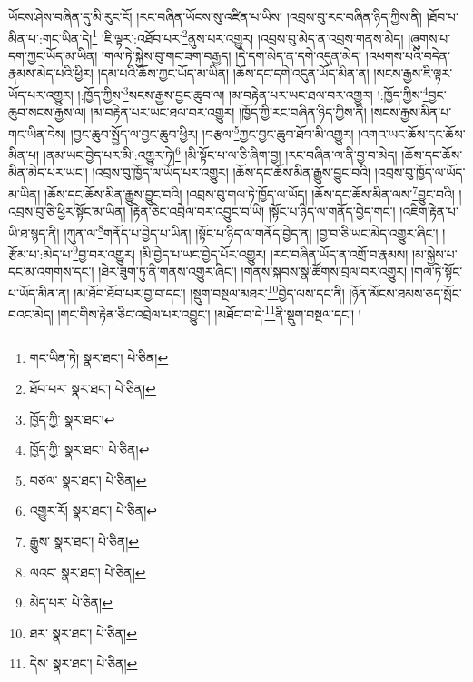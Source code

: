 ཡོངས་ཤེས་བཞིན་དུ་མི་རུང་ངོ། །རང་བཞིན་ཡོངས་སུ་འཛིན་པ་ཡིས། །འབྲས་བུ་རང་བཞིན་ཉིད་ཀྱིས་ནི། །ཐོབ་པ་མིན་པ་:གང་ཡིན་དེ།\footnote{གང་ཡིན་ཏེ།  སྣར་ཐང་།  པེ་ཅིན། } །ཇི་ལྟར་:འཐོབ་པར་\footnote{ཐོབ་པར་  སྣར་ཐང་།  པེ་ཅིན། }ནུས་པར་འགྱུར། །འབྲས་བུ་མེད་ན་འབྲས་གནས་མེད། །ཞུགས་པ་དག་ཀྱང་ཡོད་མ་ཡིན། །གལ་ཏེ་སྐྱེས་བུ་གང་ཟག་བརྒྱད། །དེ་དག་མེད་ན་དགེ་འདུན་མེད། །འཕགས་པའི་བདེན་རྣམས་མེད་པའི་ཕྱིར། །དམ་པའི་ཆོས་ཀྱང་ཡོད་མ་ཡིན། །ཆོས་དང་དགེ་འདུན་ཡོད་མིན་ན། །སངས་རྒྱས་ཇི་ལྟར་ཡོད་པར་འགྱུར། །:ཁྱོད་ཀྱིས་\footnote{ཁྱོད་ཀྱི་  སྣར་ཐང་། }སངས་རྒྱས་བྱང་ཆུབ་ལ། །མ་བརྟེན་པར་ཡང་ཐལ་བར་འགྱུར། །:ཁྱོད་ཀྱིས་\footnote{ཁྱོད་ཀྱི་  སྣར་ཐང་།  པེ་ཅིན། }བྱང་ཆུབ་སངས་རྒྱས་ལ། །མ་བརྟེན་པར་ཡང་ཐལ་བར་འགྱུར། །ཁྱོད་ཀྱི་རང་བཞིན་ཉིད་ཀྱིས་ནི། །སངས་རྒྱས་མིན་པ་གང་ཡིན་དེས། །བྱང་ཆུབ་སྤྱོད་ལ་བྱང་ཆུབ་ཕྱིར། །བརྩལ་\footnote{བཙལ་  སྣར་ཐང་།  པེ་ཅིན། }ཀྱང་བྱང་ཆུབ་ཐོབ་མི་འགྱུར། །འགའ་ཡང་ཆོས་དང་ཆོས་མིན་པ། །ནམ་ཡང་བྱེད་པར་མི་:འགྱུར་ཏེ།\footnote{འགྱུར་རོ།  སྣར་ཐང་།  པེ་ཅིན། } །མི་སྟོང་པ་ལ་ཅི་ཞིག་བྱ། །རང་བཞིན་ལ་ནི་བྱ་བ་མེད། །ཆོས་དང་ཆོས་མིན་མེད་པར་ཡང་། །འབྲས་བུ་ཁྱོད་ལ་ཡོད་པར་འགྱུར། །ཆོས་དང་ཆོས་མིན་རྒྱུས་བྱུང་བའི། །འབྲས་བུ་ཁྱོད་ལ་ཡོད་མ་ཡིན། །ཆོས་དང་ཆོས་མིན་རྒྱུས་བྱུང་བའི། །འབྲས་བུ་གལ་ཏེ་ཁྱོད་ལ་ཡོད། །ཆོས་དང་ཆོས་མིན་ལས་\footnote{རྒྱུས་  སྣར་ཐང་།  པེ་ཅིན། }བྱུང་བའི། །འབྲས་བུ་ཅི་ཕྱིར་སྟོང་མ་ཡིན། །རྟེན་ཅིང་འབྲེལ་བར་འབྱུང་བ་ཡི། །སྟོང་པ་ཉིད་ལ་གནོད་བྱེད་གང་། །འཇིག་རྟེན་པ་ཡི་ཐ་སྙད་ནི། །ཀུན་ལ་\footnote{ལའང་  སྣར་ཐང་།  པེ་ཅིན། }གནོད་པ་བྱེད་པ་ཡིན། །སྟོང་པ་ཉིད་ལ་གནོད་བྱེད་ན། །བྱ་བ་ཅི་ཡང་མེད་འགྱུར་ཞིང་། །རྩོམ་པ་:མེད་པ་\footnote{མེད་པར་  པེ་ཅིན། }བྱ་བར་འགྱུར། །མི་བྱེད་པ་ཡང་བྱེད་པོར་འགྱུར། །རང་བཞིན་ཡོད་ན་འགྲོ་བ་རྣམས། །མ་སྐྱེས་པ་དང་མ་འགགས་དང་། །ཐེར་ཟུག་ཏུ་ནི་གནས་འགྱུར་ཞིང་། །གནས་སྐབས་སྣ་ཚོགས་བྲལ་བར་འགྱུར། །གལ་ཏེ་སྟོང་པ་ཡོད་མིན་ན། །མ་ཐོབ་ཐོབ་པར་བྱ་བ་དང་། །སྡུག་བསྔལ་མཐར་\footnote{ཐར་  སྣར་ཐང་།  པེ་ཅིན། }བྱེད་ལས་དང་ནི། །ཉོན་མོངས་ཐམས་ཅད་སྤོང་བའང་མེད། །གང་གིས་རྟེན་ཅིང་འབྲེལ་པར་འབྱུང་། །མཐོང་བ་དེ་\footnote{དེས་  སྣར་ཐང་།  པེ་ཅིན། }ནི་སྡུག་བསྔལ་དང་། །
